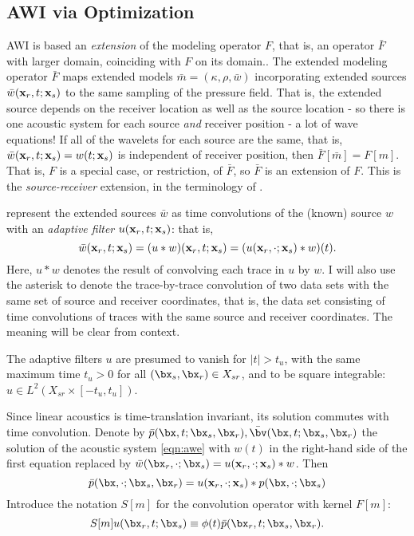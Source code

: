 \subsection{AWI via Optimization}

AWI is based an {\em extension} of the modeling operator $F$, that is,
an operator ${\bar F}$ with larger domain, coinciding with $F$ on its domain..
The extended modeling operator ${\bar F}$ maps extended models
$\bar{m}=(\kappa,\rho,\bar{w})$ incorporating extended sources
$\bar{w}({\bf x}_r,t;{\bf x}_s)$ to the same sampling of the pressure
field. That is, the extended source depends on the receiver location
as well as the source location - so there is one acoustic system for
each source {\em and} receiver position - a lot of wave equations! If all
of the wavelets for each source are the same, that is, ${\bar w}({\bf
  x}_r,t;{\bf x}_s) = w(t;{\bf x}_s)$ is independent of receiver
position, then ${\bar F}[\bar{m}] = F[m]$. That is, $F$ is a special
case, or restriction, of ${\bar F}$, so ${\bar F}$ is an extension of
$F$. This is the {\em source-receiver} extension, in the terminology of \cite{HuangSymes2015SEG}.

\cite{Warner:16} represent the extended sources $\bar{w}$ as time convolutions of the
(known) source $w$ with an {\em adaptive filter} $u({\bf
  x}_r,t;{\bf x}_s)$: that is,
\[
  \bar{w}({\bf x}_r,t;{\bf x}_s) = (u * w)({\bf  x}_r,t;{\bf x}_s)
  = (u({\bf  x}_r,\cdot;{\bf x}_s)*w)(t).
\]
Here, $u*w$ denotes the result of convolving each trace in $u$ by $w$. I
will also use the asterisk to denote the trace-by-trace convolution
of two data sets with the same set of source and receiver coordinates,
that is, the data set consisting of time convolutions of traces with the same source
and receiver coordinates. The meaning will be clear from context.

The adaptive filters $u$ are presumed to vanish for $|t| > t_u$, with
the same maximum time $t_u>0$ for all $(\bx_s,\bx_r) \in X_{sr}$, and
to be square integrable: $u \in L^2(X_{sr}\times [-t_u,t_u])$. 

Since linear acoustics is time-translation invariant, its solution commutes with time convolution.
Denote by $\bar{p}(\bx,t;\bx_s,\bx_r), \bar{\bv}(\bx,t;\bx_s,\bx_r)$
the solution of the acoustic system \ref{eqn:awe} with $w(t)$ in the
right-hand side of the first equation replaced by
$\bar{w}(\bx_r,\cdot;\bx_s) = u({\bf  x}_r,\cdot;{\bf
  x}_s)*w$. Then
\[
  \bar{p}(\bx,\cdot;\bx_s,\bx_r) = u({\bf  x}_r,\cdot;{\bf
    x}_s)*p(\bx,\cdot;\bx_s)
\]
Introduce the notation $S[m]$ for the convolution operator with kernel $F[m]$:
\begin{equation}
  \label{eqn:sdef}
  S[m]u(\bx_r,t;\bx_s) \equiv \phi(t)\bar{p}(\bx_r,t;\bx_s,\bx_r).
\end{equation}

